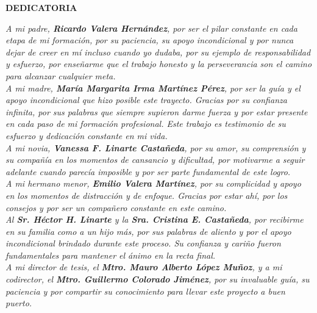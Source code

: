 \documentclass[12pt]{report}
\begin{document}
\thispagestyle{empty}
\begin{center}
    {\Large \textbf{DEDICATORIA}}\\[2cm]

    \begin{minipage}{0.8\textwidth}
    \itshape
    A mi padre, \textbf{Ricardo Valera Hernández}, por ser el pilar constante en cada etapa de mi formación, por su paciencia, su apoyo incondicional y por nunca dejar de creer en mí incluso cuando yo dudaba, por su ejemplo de responsabilidad y esfuerzo, por enseñarme que el trabajo honesto y 
    la perseverancia son el camino para alcanzar cualquier meta.\\[0.3cm]

    A mi madre, \textbf{María Margarita Irma Martínez Pérez}, por ser la guía y el apoyo incondicional que hizo posible este trayecto. Gracias por su confianza infinita, por sus palabras que siempre supieron darme fuerza y por estar presente en cada paso de mi formación profesional. Este 
    trabajo es testimonio de su esfuerzo y dedicación constante en mi vida.\\[0.3cm]

    A mi novia, \textbf{Vanessa F. Linarte Castañeda}, por su amor, su comprensión y su compañía en los momentos de cansancio y dificultad, por motivarme a seguir adelante cuando parecía imposible y por ser parte fundamental de este logro.\\[0.3cm]

    A mi hermano menor, \textbf{Emilio Valera Martínez}, por su complicidad y apoyo en los momentos de distracción y de enfoque. Gracias por estar ahí, por los consejos y por ser un compañero constante en este camino.\\[0.3cm]

    Al \textbf{Sr. Héctor H. Linarte} y la \textbf{Sra. Cristina E. Castañeda}, por recibirme en su familia como a un hijo más, por sus palabras de aliento y por el apoyo incondicional brindado durante este proceso. Su confianza y cariño fueron fundamentales para mantener el ánimo 
    en la recta final.\\[0.3cm]

    A mi director de tesis, el \textbf{Mtro. Mauro Alberto López Muñoz}, y a mi codirector, el \textbf{Mtro. Guillermo Colorado Jiménez}, por su invaluable guía, su paciencia y por compartir su conocimiento para llevar este proyecto a buen puerto.
    \end{minipage}
\end{center}
\end{document}
